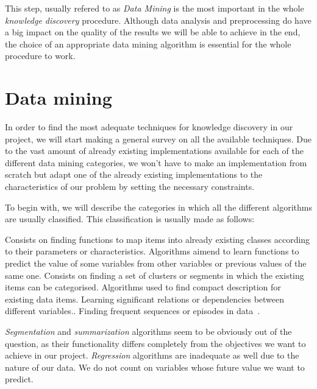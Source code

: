 \documentclass[a4paper,12pt]{article}
\begin{document}
This step, usually refered to as \emph{Data Mining} is the most important in the whole \emph{knowledge discovery} procedure. Although data analysis and preprocessing do have a big impact on the quality of the results we will be able to achieve in the end, the choice of an appropriate data mining algorithm is essential for the whole procedure to work.

\section{Data mining}\label{sec:datamining}
In order to find the most adequate techniques for knowledge discovery in our project, we will start making a general survey on all the available techniques. Due to the vast amount of already existing implementations available for each of the different data mining categories, we won't have to make an implementation from scratch but adapt one of the already existing implementations to the characteristics of our problem by setting the necessary constraints.

To begin with, we will describe the categories in which all the different algorithms are usually classified. This classification is usually made as follows:

\begin{enumerate}
  Consists on finding functions to map items into already existing classes according to their parameters or characteristics.
  Algorithms aimend to learn functions to predict the value of some variables from other variables or previous values of the same one.
  Consists on finding a set of clusters or segments in which the existing items can be categorised.
  Algorithms used to find compact description for existing data items.
  Learning significant relations or dependencies between different variables.\cite{Zhao2003association}.
  Finding frequent sequences or episodes in data~\cite{zhao2003sequential,weiss2002predicting}.
\end{enumerate}

\emph{Segmentation} and \emph{summarization} algorithms seem to be obviously out of the question, as their functionality differs completely from the objectives we want to achieve in our project. \emph{Regression} algorithms are inadequate as well due to the nature of our data. We do not count on variables whose future value we want to predict.
\end{document}

